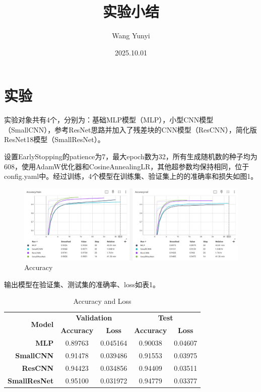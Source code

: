 \documentclass{article}
\title{\heiti\zihao{2} 实验小结}
\author{\songti Wang Yunyi}
\date{2025.10.01}
\begin{document}
	\maketitle
	\thispagestyle{empty}


\section{实验}
实验对象共有4个，分别为：基础MLP模型（MLP），小型CNN模型（SmallCNN），参考ResNet思路并加入了残差块的CNN模型（ResCNN），简化版ResNet18模型（SmallResNet）。

设置EarlyStopping的patience为7，最大epoch数为32，所有生成随机数的种子均为608，使用AdamW优化器和CosineAnnealingLR，其他超参数均保持相同，位于config.yaml中。经过训练，4个模型在训练集、验证集上的的准确率和损失如图1。
\begin{figure}[htbp]
	\centering
	\includegraphics[width=1\textwidth]{tensorboard_accuracy.png}
	\caption{Accuracy}
	\label{accuracy}
\end{figure}

输出模型在验证集、测试集的准确率、loss如表1。
\begin{table}[!ht]
    \begin{center}
        \begin{tabular}{|r|c|c|c|c|}
            \hline
            \multirow{2}{*}{\textbf{Model}} & \multicolumn{2}{c|}{\textbf{Validation}} & \multicolumn{2}{c|}{\textbf{Test}}\\
            \cline{2-5}
            ~ & \textbf{Accuracy} & \textbf{Loss} & \textbf{Accuracy} & \textbf{Loss} \\
            \hline
            \textbf{MLP} & 0.89763 & 0.045164 & 0.90038 & 0.04607 \\ \hline
            \textbf{SmallCNN} & 0.91478 & 0.039486 & 0.91553 & 0.03975 \\ \hline
            \textbf{ResCNN} & 0.94423 & 0.034856 & 0.94409 & 0.03511 \\ \hline
            \textbf{SmallResNet} & 0.95100 & 0.031972 & 0.94779 & 0.03377 \\ \hline
        \end{tabular}
        \caption{Accuracy and Loss}
        \label{tab:results}
    \end{center}
\end{table}
\end{document}
